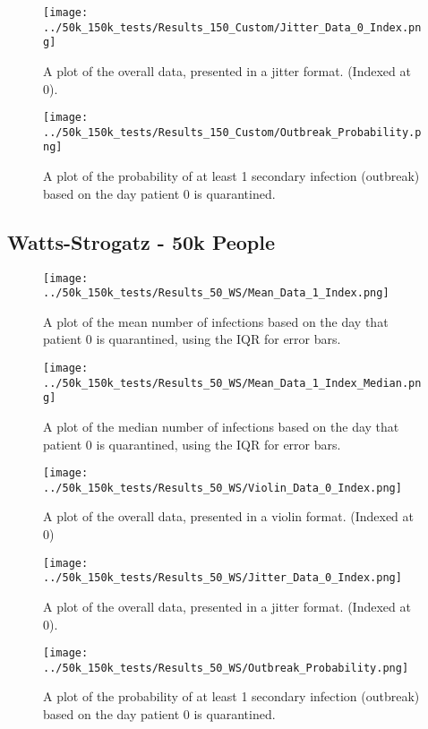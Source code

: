 \documentclass{article}
\numberwithin{equation}{section} %
\begin{document}
\begin{figure}[H]
  \centering
  \texttt{[image: ../50k\_150k\_tests/Results\_150\_Custom/Jitter\_Data\_0\_Index.png]}
  \caption{A plot of the overall data, presented in a jitter format. (Indexed at 0).}
\end{figure}

\begin{figure}[H]
  \centering
  \texttt{[image: ../50k\_150k\_tests/Results\_150\_Custom/Outbreak\_Probability.png]}
  \caption{A plot of the probability of at least 1 secondary infection (outbreak) based on the day patient 0 is quarantined.}
\end{figure}

\subsection{Watts-Strogatz - 50k People}
\begin{figure}[H]
  \centering
  \texttt{[image: ../50k\_150k\_tests/Results\_50\_WS/Mean\_Data\_1\_Index.png]}
  \caption{A plot of the mean number of infections based on the day that patient 0 is quarantined, using the IQR for error bars.}
\end{figure}

\begin{figure}[H]
  \centering
  \texttt{[image: ../50k\_150k\_tests/Results\_50\_WS/Mean\_Data\_1\_Index\_Median.png]}
  \caption{A plot of the median number of infections based on the day that patient 0 is quarantined, using the IQR for error bars.}
\end{figure}

\begin{figure}[H]
  \centering
  \texttt{[image: ../50k\_150k\_tests/Results\_50\_WS/Violin\_Data\_0\_Index.png]}
  \caption{A plot of the overall data, presented in a violin format. (Indexed at 0)}
\end{figure}

\begin{figure}[H]
  \centering
  \texttt{[image: ../50k\_150k\_tests/Results\_50\_WS/Jitter\_Data\_0\_Index.png]}
  \caption{A plot of the overall data, presented in a jitter format. (Indexed at 0).}
\end{figure}

\begin{figure}[H]
  \centering
  \texttt{[image: ../50k\_150k\_tests/Results\_50\_WS/Outbreak\_Probability.png]}
  \caption{A plot of the probability of at least 1 secondary infection (outbreak) based on the day patient 0 is quarantined.}
\end{figure}
\end{document}

